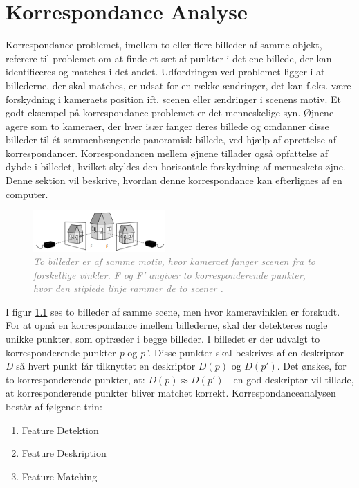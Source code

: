 \chapter{Korrespondance Analyse} \label{sec:Kor}
Korrespondance problemet, imellem to eller flere billeder af samme objekt, referere til problemet om at finde et sæt af punkter i det ene billede, der kan identificeres og matches i det andet.
Udfordringen ved problemet ligger i at billederne, der skal matches, er udsat for en række ændringer, det kan f.eks. være forskydning i kameraets position ift. scenen eller  ændringer i scenens motiv. Et godt eksempel på korrespondance problemet er det menneskelige syn. Øjnene agere som to kameraer, der hver især fanger deres billede og omdanner disse billeder til ét sammenhængende panoramisk billede, ved hjælp af oprettelse af korrespondancer. Korrespondancen mellem øjnene tillader også opfattelse af dybde i billedet, hvilket skyldes den horisontale forskydning af menneskets øjne. Denne sektion vil beskrive, hvordan denne korrespondance kan efterlignes af en computer.
\begin{figure}[H]
    \centering
    \includegraphics[width=0.45\textwidth]{fig/3.png}
     \vspace{-1em}
    \begin{center}    
       \caption{\textcolor{gray}{\footnotesize \textit{To billeder er af samme motiv, hvor kameraet fanger scenen fra to forskellige vinkler. F og F' angiver to korresponderende punkter, hvor den stiplede linje rammer de to scener \cite{kim}.}}}
    \label{fig:1}
     \end{center}
     \vspace{-2.5em}
  \end{figure} \noindent
I figur \ref{fig:1} ses to billeder af samme scene, men hvor kameravinklen er forskudt. For at opnå en korrespondance imellem billederne, skal der detekteres nogle unikke punkter, som optræder i begge billeder. I billedet er der udvalgt to korresponderende punkter \textit{p} og \textit{p'}. Disse punkter skal beskrives af en deskriptor \textit{D} så hvert punkt får tilknyttet en deskriptor $D(p)$ og $D(p')$. Det ønskes, for to korresponderende punkter, at: $D(p)\approx D(p')$ - en god deskriptor vil tillade, at korresponderende punkter bliver matchet korrekt. Korrespondanceanalysen består af følgende trin:
\begin{enumerate}
\item{Feature Detektion}
\item{Feature Deskription}
\item{Feature Matching}
\end{enumerate}
